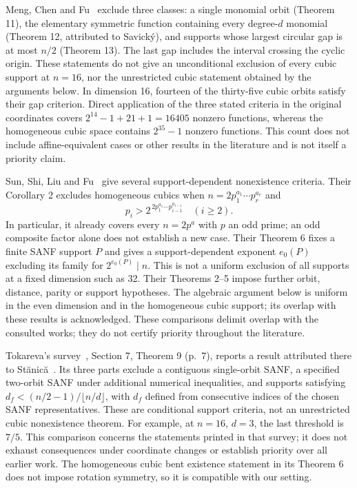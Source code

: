 \documentclass[11pt,a4paper]{article}
\begin{document}
Meng, Chen and Fu~\cite{meng} exclude three classes: a single monomial orbit (Theorem 11), the elementary symmetric function containing every degree-$d$ monomial (Theorem 12, attributed to Savick\'y), and supports whose largest circular gap is at most $n/2$ (Theorem 13). The last gap includes the interval crossing the cyclic origin. These statements do not give an unconditional exclusion of every cubic support at $n=16$, nor the unrestricted cubic statement obtained by the arguments below. In dimension 16, fourteen of the thirty-five cubic orbits satisfy their gap criterion. Direct application of the three stated criteria in the original coordinates covers $2^{14}-1+21+1=16405$ nonzero functions, whereas the homogeneous cubic space contains $2^{35}-1$ nonzero functions. This count does not include affine-equivalent cases or other results in the literature and is not itself a priority claim.

Sun, Shi, Liu and Fu~\cite{sun} give several support-dependent nonexistence criteria. Their Corollary 2 excludes homogeneous cubics when $n=2p_1^{a_1}\cdots p_r^{a_r}$ and
\[
 p_i>2^{\,2p_1^{a_1}\cdots p_{i-1}^{a_{i-1}}}\quad (i\ge2).
\]
In particular, it already covers every $n=2p^a$ with $p$ an odd prime; an odd composite factor alone does not establish a new case. Their Theorem 6 fixes a finite SANF support $P$ and gives a support-dependent exponent $e_0(P)$ excluding its family for $2^{e_0(P)}\mid n$. This is not a uniform exclusion of all supports at a fixed dimension such as 32. Their Theorems 2--5 impose further orbit, distance, parity or support hypotheses. The algebraic argument below is uniform in the even dimension and in the homogeneous cubic support; its overlap with these results is acknowledged. These comparisons delimit overlap with the consulted works; they do not certify priority throughout the literature.

Tokareva's survey~\cite{tokareva}, Section 7, Theorem 9 (p.~7), reports a result attributed there to St\u{a}nic\u{a}~\cite{stanica2008}. Its three parts exclude a contiguous single-orbit SANF, a specified two-orbit SANF under additional numerical inequalities, and supports satisfying $d_f<(n/2-1)/\lfloor n/d\rfloor$, with $d_f$ defined from consecutive indices of the chosen SANF representatives. These are conditional support criteria, not an unrestricted cubic nonexistence theorem. For example, at $n=16$, $d=3$, the last threshold is $7/5$. This comparison concerns the statements printed in that survey; it does not exhaust consequences under coordinate changes or establish priority over all earlier work. The homogeneous cubic bent existence statement in its Theorem 6 does not impose rotation symmetry, so it is compatible with our setting.
\end{document}
